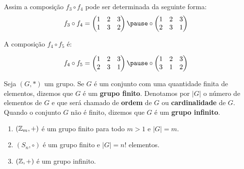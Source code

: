 \documentclass{beamer}
\begin{document}
    \begin{frame}
        Assim a composição $f_3 \circ f_4$ pode ser determinada da seguinte forma:
        \[
            f_3\circ f_4 = \begin{pmatrix}
                    1 & 2 & 3\\
                    1 & 3 & 2
                \end{pmatrix} \pause \circ \begin{pmatrix}
                    1 & 2 & 3\\
                    2 & 3 & 1
                \end{pmatrix}
        \]
    \end{frame}

    \begin{frame}
        A composição $f_4 \circ f_5$ é:

        \[
            f_4\circ f_5 = \begin{pmatrix}
                    1 & 2 & 3\\
                    2 & 3 & 1
                \end{pmatrix} \pause \circ \begin{pmatrix}
                    1 & 2 & 3\\
                    3 & 1 & 2
                \end{pmatrix}
        \]
    \end{frame}

    \begin{frame}
        \begin{definicao}
            Seja $(G,*)$ um grupo. \pause Se $G$ é um conjunto com uma quantidade finita de elementos, \pause dizemos que $G$ é um \textbf{grupo finito}. \pause Denotamos por $|G|$ \pause o número de elementos de $G$ \pause e que será chamado de \textbf{ordem} de $G$ \pause ou \textbf{cardinalidade} de $G$. \pause Quando o conjunto $G$ não é finito, \pause dizemos que $G$ é um \textbf{grupo infinito}.\pause
        \end{definicao}

        \begin{exemplos}
            \begin{enumerate}[label={\roman*})]
                \item $(\mathbb{Z}_m, +)$ é um grupo finito para todo $m>1$ \pause e $|G| = m$.\pause
                \item $(S_n, \circ)$ é um grupo finito \pause e $|G| = n!$ elementos.\pause
                \item $(\mathbb{Z}, +)$ é um grupo infinito.
            \end{enumerate}
        \end{exemplos}
    \end{frame}
\end{document}
